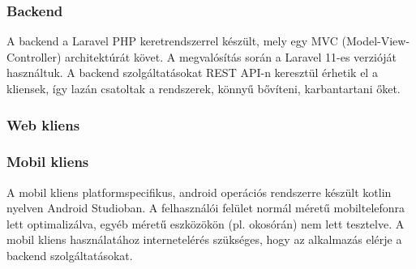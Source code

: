 \subsubsection{Backend}

A backend a Laravel PHP keretrendszerrel készült, mely egy MVC (Model-View-Controller) architektúrát követ. A megvalósítás során a Laravel 11-es verzióját használtuk. A backend szolgáltatásokat REST API-n keresztül érhetik el a kliensek, így lazán csatoltak a rendszerek, könnyű bővíteni, karbantartani őket.

\subsubsection{Web kliens}

\subsubsection{Mobil kliens}
A mobil kliens platformspecifikus, android operációs rendszerre készült kotlin nyelven Android Studioban.
A felhasználói felület normál méretű mobiltelefonra lett optimalizálva, egyéb méretű eszközökön (pl. okosórán) nem lett tesztelve.
A mobil kliens használatához internetelérés szükséges, hogy az alkalmazás elérje a backend szolgáltatásokat. 